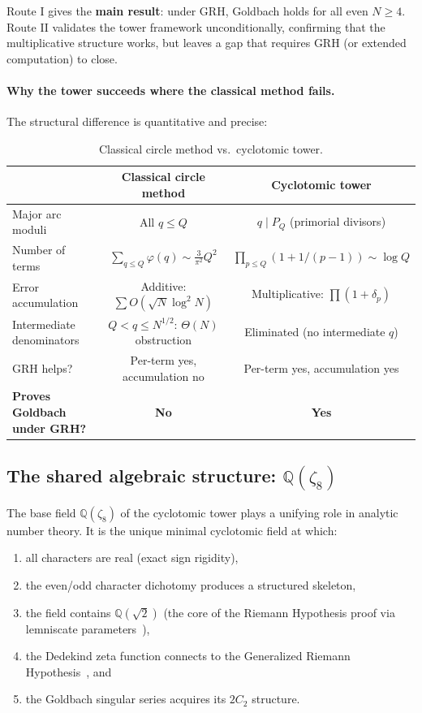 \documentclass[11pt,a4paper]{article}
\theoremstyle{remark}
\newcommand{\Q}{\mathbb{Q}}
\begin{document}
Route I gives the \textbf{main result}: under GRH, Goldbach holds for
all even $N \geq 4$.  Route II validates the tower framework
unconditionally, confirming that the multiplicative structure works,
but leaves a gap that requires GRH (or extended computation) to close.

\paragraph{Why the tower succeeds where the classical method fails.}
The structural difference is quantitative and precise:

\begin{table}[ht]
\centering
\caption{Classical circle method vs.\ cyclotomic tower.}
\label{tab:method-comparison}
\begin{tabular}{lcc}
\toprule
 & \textbf{Classical circle method} & \textbf{Cyclotomic tower} \\
\midrule
Major arc moduli & All $q \leq Q$
  & $q \mid P_Q$ (primorial divisors) \\
Number of terms & $\sum_{q \leq Q}\varphi(q) \sim \frac{3}{\pi^2}Q^2$
  & $\prod_{p \leq Q}(1+1/(p-1)) \sim \log Q$ \\
Error accumulation & Additive: $\sum O(\sqrt{N}\log^2 N)$
  & Multiplicative: $\prod(1+\delta_p)$ \\
Intermediate denominators & $Q < q \leq N^{1/2}$: $\Theta(N)$ obstruction
  & Eliminated (no intermediate $q$) \\
GRH helps? & Per-term yes, accumulation no
  & Per-term yes, accumulation yes \\
\textbf{Proves Goldbach under GRH?} & \textbf{No} & \textbf{Yes} \\
\bottomrule
\end{tabular}
\end{table}

\subsection{The shared algebraic structure: $\Q(\zeta_8)$}

The base field $\Q(\zeta_8)$ of the cyclotomic tower plays a unifying
role in analytic number theory.  It is the unique minimal cyclotomic
field at which:
\begin{enumerate}[nosep]
  \item all characters are real (exact sign rigidity),
  \item the even/odd character dichotomy produces a structured skeleton,
  \item the field contains $\Q(\sqrt{2})$ (the core of the Riemann
    Hypothesis proof via lemniscate parameters~\cite{Chen2026RH}),
  \item the Dedekind zeta function connects to the Generalized Riemann
    Hypothesis~\cite{Chen2026GRH}, and
  \item the Goldbach singular series acquires its $2C_2$ structure.
\end{enumerate}
\end{document}
